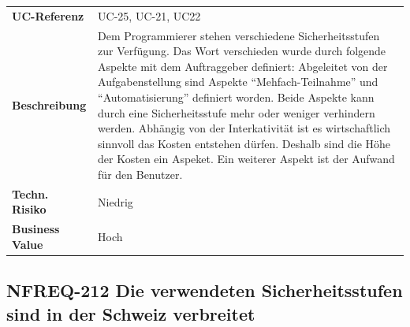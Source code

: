 \begin{longtable}[c]{@{}ll@{}}
\toprule
\begin{minipage}[t]{0.20\columnwidth}\raggedright\strut
\textbf{UC-Referenz}
\strut\end{minipage} &
\begin{minipage}[t]{0.74\columnwidth}\raggedright\strut
UC-25, UC-21, UC22
\strut\end{minipage}\tabularnewline
\begin{minipage}[t]{0.20\columnwidth}\raggedright\strut
\textbf{Beschreibung}
\strut\end{minipage} &
\begin{minipage}[t]{0.74\columnwidth}\raggedright\strut
Dem Programmierer stehen verschiedene Sicherheitsstufen zur Verfügung.
Das Wort verschieden wurde durch folgende Aspekte mit dem Auftraggeber
definiert: Abgeleitet von der Aufgabenstellung sind Aspekte
``Mehfach-Teilnahme'' und ``Automatisierung'' definiert worden. Beide
Aspekte kann durch eine Sicherheitsstufe mehr oder weniger verhindern
werden. Abhängig von der Interkativität ist es wirtschaftlich sinnvoll
das Kosten entstehen dürfen. Deshalb sind die Höhe der Kosten ein
Aspeket. Ein weiterer Aspekt ist der Aufwand für den Benutzer.
\strut\end{minipage}\tabularnewline
\begin{minipage}[t]{0.20\columnwidth}\raggedright\strut
\textbf{Techn. Risiko}
\strut\end{minipage} &
\begin{minipage}[t]{0.74\columnwidth}\raggedright\strut
Niedrig
\strut\end{minipage}\tabularnewline
\begin{minipage}[t]{0.20\columnwidth}\raggedright\strut
\textbf{Business Value}
\strut\end{minipage} &
\begin{minipage}[t]{0.74\columnwidth}\raggedright\strut
Hoch
\strut\end{minipage}\tabularnewline
\bottomrule
\end{longtable}

\subsection{NFREQ-212 Die verwendeten Sicherheitsstufen sind in der
Schweiz
verbreitet}\label{nfreq-212-die-verwendeten-sicherheitsstufen-sind-in-der-schweiz-verbreitet}

